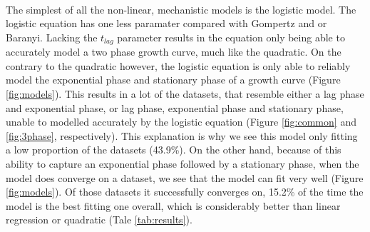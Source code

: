 \documentclass[11pt, a4paper]{article} %
\begin{document}
\paragraph{} The simplest of all the non-linear, mechanistic models is the logistic model. The logistic equation has one less paramater compared with Gompertz and or Baranyi. Lacking the $t_{lag}$ parameter results in the equation only being able to accurately model a two phase growth curve, much like the quadratic. On the contrary to the quadratic however, the logistic equation is only able to reliably model the exponential phase and stationary phase of a growth curve (Figure \ref{fig:models}). This results in a lot of the datasets, that resemble either a lag phase and exponential phase, or lag phase, exponential phase and stationary phase, unable to modelled accurately by the logistic equation (Figure \ref{fig:common} and \ref{fig:3phase}, respectively). This explanation is why we see this model only fitting a low proportion of the datasets (43.9\%). On the other hand, because of this ability to capture an exponential phase followed by a stationary phase, when the model does converge on a dataset, we see that the model can fit very well (Figure \ref{fig:models}). Of those datasets it successfully converges on, 15.2\% of the time the model is the best fitting one overall, which is considerably better than linear regression or quadratic (Tale \ref{tab:results}).
\end{document}
